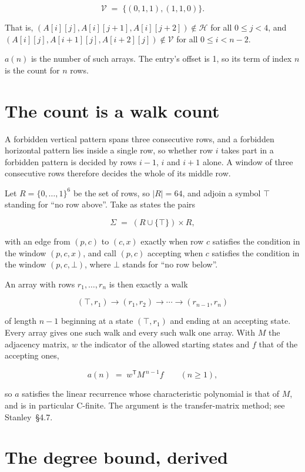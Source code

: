 \documentclass[11pt]{article}
\theoremstyle{definition}
\begin{document}
\[\mathcal{V} \;=\; \{(0,1,1), (1,1,0)\}.\]

That is, $(A[i][j],A[i][j{+}1],A[i][j{+}2]) \notin \mathcal{H}$ for all $0 \le j < 4$, and $(A[i][j],A[i{+}1][j],A[i{+}2][j]) \notin \mathcal{V}$ for all $0 \le i < n-2$.

$a(n)$ is the number of such arrays. The entry's offset is 1, so its term of index $n$ is the count for $n$ rows.

\section{The count is a walk count}

A forbidden vertical pattern spans three consecutive rows, and a forbidden horizontal pattern lies inside a single row, so whether row $i$ takes part in a forbidden pattern is decided by rows $i-1$, $i$ and $i+1$ alone. A window of three consecutive rows therefore decides the whole of its middle row.

Let $R = \{0,\dots,1\}^{6}$ be the set of rows, so $|R| = 64$, and adjoin a symbol $\top$ standing for ``no row above''. Take as states the pairs

\[\Sigma \;=\; (R \cup \{\top\}) \times R,\]

with an edge from $(p,c)$ to $(c,x)$ exactly when row $c$ satisfies the condition in the window $(p,c,x)$, and call $(p,c)$ accepting when $c$ satisfies the condition in the window $(p,c,\bot)$, where $\bot$ stands for ``no row below''.

An array with rows $r_1,\dots,r_n$ is then exactly a walk

\[(\top,r_1) \to (r_1,r_2) \to \cdots \to (r_{n-1},r_n)\]

of length $n-1$ beginning at a state $(\top,r_1)$ and ending at an accepting state. Every array gives one such walk and every such walk one array. With $M$ the adjacency matrix, $w$ the indicator of the allowed starting states and $f$ that of the accepting ones,

\[a(n) \;=\; w^{\mathsf T} M^{\,n-1} f \qquad (n \ge 1),\]

so $a$ satisfies the linear recurrence whose characteristic polynomial is that of $M$, and is in particular C-finite. The argument is the transfer-matrix method; see Stanley~\S4.7.

\section{The degree bound, derived}
\end{document}
